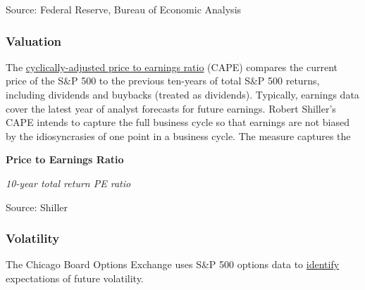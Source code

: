 \documentclass{report}
\makeatletter
\newcommand{\tbllink}[1]{\href{https://raw.githubusercontent.com/bdecon/US-chartbook/master/chartbook/data/#1}{\faTable}}
\newcommand*\short[1]{\expandafter\@gobbletwo\number\numexpr#1\relax}
\newcommand{\dateaxisticks}{
		date coordinates in=x, axis line style={draw=none},
		xmax={2020-10-01},
		max space between ticks=40,	    
		xtick={{1990-01-01}, {1992-01-01}, {1994-01-01}, 
			{1996-01-01}, {1998-01-01}, {2000-01-01}, 
			{2002-01-01}, {2004-01-01}, {2006-01-01},
			{2008-01-01}, {2010-01-01}, {2012-01-01}, {2014-01-01},
		    {2016-01-01}, {2018-01-01}, {2020-01-01}},
		minor xtick={{1989-01-01}, {1991-01-01}, {1993-01-01},
			{1995-01-01}, {1997-01-01}, {1999-01-01}, 
			{2001-01-01}, {2003-01-01}, {2005-01-01}, {2007-01-01},
		    {2009-01-01}, {2011-01-01}, {2013-01-01}, {2015-01-01},
		    {2017-01-01}, {2019-01-01}},
		enlarge y limits={0.06}, enlarge x limits={0.01},
		}
\newcommand{\bbar}[2]{extra #1 ticks = {{#2}}, extra #1 tick labels = ,
		extra #1 tick style = {grid=major, grid style={thick, black!25}},}
\newcommand{\stdline}[4]{\addplot[very thick, no markers, color=#1] 
		table [x=#2, y=#3, col sep=comma] {#4};	}
\newcommand{\rbars}{
		\fill[color=black!10] (axis cs:{1990-07-01},\pgfkeysvalueof{/pgfplots/ymin}) rectangle 
			(axis cs:{1991-03-01}, \pgfkeysvalueof{/pgfplots/ymax});
		\fill[color=black!10] (axis cs:{2007-12-01},\pgfkeysvalueof{/pgfplots/ymin}) rectangle 
			(axis cs:{2009-07-01}, \pgfkeysvalueof{/pgfplots/ymax});
		\fill[color=black!10] (axis cs:{2001-03-01},\pgfkeysvalueof{/pgfplots/ymin}) rectangle 
			(axis cs:{2001-11-01}, \pgfkeysvalueof{/pgfplots/ymax});
		\fill[color=black!10] (axis cs:{2020-02-01},\pgfkeysvalueof{/pgfplots/ymin}) rectangle 
			(axis cs:{2020-10-01}, \pgfkeysvalueof{/pgfplots/ymax});}
\makeatother
\begin{document}
{{{{{{{{{\begin{minipage}{0.76\textwidth}
\footnotesize{Source: Federal Reserve, Bureau of Economic Analysis} \hfill \tbllink{eq_payout.csv}

\vspace{3mm}

\subsubsection*{\color{black!70} \seriffont Valuation}
\small The \href{http://www.econ.yale.edu/~shiller/data.htm}{cyclically-adjusted price to earnings ratio} (CAPE) compares the current price of the S\&P 500 to the previous ten-years of total S\&P 500 returns, including dividends and buybacks (treated as dividends). Typically, earnings data cover the latest year of analyst forecasts for future earnings. Robert Shiller's CAPE intends to capture the full business cycle so that earnings are not biased by the idiosyncrasies of one point in a business cycle. The measure captures the 

\vspace{3mm}

\normalsize \textbf{Price to Earnings Ratio}

\footnotesize{\textit{10-year total return PE ratio}}

\hspace*{-2mm} 

\footnotesize{Source: Shiller} \hfill \tbllink{catrpe.csv}

\vspace{3mm}

\subsubsection*{\color{black!70} \seriffont Volatility}

\small The Chicago Board Options Exchange uses S\&P 500 options data to \href{http://www.cboe.com/vix}{identify} expectations of future volatility. 

\vspace{3mm}


\end{minipage}}}}}}}}}}
\end{document}

